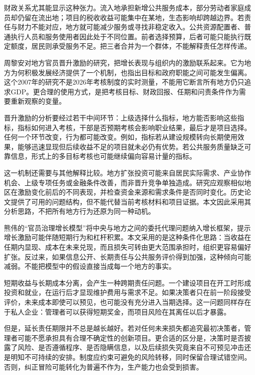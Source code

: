 \documentclass[UTF8,fontset=fandol,zihao=-4,oneside,openany]{ctexbook}
\begin{document}
财政关系尤其能显示这种张力。流入地承担新增公共服务成本，部分劳动者家庭成员却仍留在流出地；项目的税收收益可能集中在某地，生态影响却跨越边界。若责任与财力不能对应，地方就可能减少服务或寻找非稳定收入。公共资源配置者、普通执行人员和服务使用者因此处于不同位置。前者选择预算，后者可能只能执行既定额度，居民则承受服务不足。把三者合并为一个群体，不能解释责任怎样传递。

周黎安对地方官员晋升激励的研究，把增长表现与组织内的激励联系起来。它为地方为何积极发展经济提供了一个机制，也指出目标和政府职能之间可能发生偏离。这个2007年的研究不是2026年考核制度的实时测量，不能用它断言所有地方仍只追求GDP。更合理的使用方式，是把考核目标、财政回报、任期和问责条件作为需要重新观察的变量。\cite{Zhou2007}

\label{arg:P022}
晋升激励的分析要经过若干中间环节：上级选择什么指标，地方能否影响这些指标，指标如何进入考核，干部是否预期考核会影响职业结果，最后才是项目选择。任何一个环节改变，行为都可能改变。例如，指标若从建设规模转向长期使用效果，能够迅速显现但后续收益不足的项目就未必仍有优势。若公共服务质量缺乏可靠信息，形式上的多目标考核也可能继续偏向容易计量的指标。

这一机制还需要与其他解释比较。地方扩张投资可能来自居民实际需求、产业协作机会、上级专项任务或金融条件改善，而非晋升竞争单独造成。研究应观察相似地区在激励变化前后的不同表现，并检查资金来源和需求条件是否同时变化。历史论文提供了可用的问题结构，但不能代替当前考核材料和项目证据。本文因此采用其分析思路，不把所有地方行为还原为同一种动机。

熊伟的“官员治理增长模型”将中央与地方之间的委托代理问题纳入增长框架，提示增长激励可能伴随短期行为和杠杆积累。本文采用的是这种条件化思路：当收益在任期内显现、成本在未来兑现，而且损失可转由更大范围承担时，组织更容易偏好扩张。反过来，如果信息公开、长期责任与公共服务评价得到加强，这种倾向可能减弱。不能把模型中的假设直接当成每一个地方的事实。\cite{Xiong2018}

\label{arg:P023}
短期收益与长期成本分离，会产生一种跨期责任问题。一个建设项目在开工时形成投资和就业，在运行后才显现维护费用与需求不足。如果决策者只在前一阶段接受评价，未来成本即使可以预见，也可能没有充分进入当期选择。这一问题同样存在于私人企业：管理者可以获得短期奖金，而项目风险在其离任以后才暴露。

但是，延长责任期限并不总是越长越好。若对任何未来损失都追究最初决策者，管理者可能不愿承担具有合理不确定性的创新项目。更合适的区分是，决策时是否披露了风险、是否遵循程序、是否隐瞒信息，以及后续损失究竟来自不可预见冲击还是明知不可持续的安排。制度应约束可避免的风险转移，同时保留合理试错空间。否则，纠正冒险可能转化为普遍不作为，生产能力也会受到损害。
\end{document}
